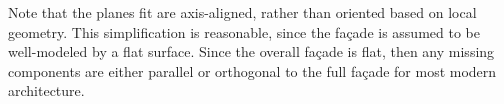 \documentclass{article}
\begin{document}

%
%

Note that the planes fit are axis-aligned, rather than oriented based on local geometry.  This simplification is reasonable, since the fa\c{c}ade is assumed to be well-modeled by a flat surface.  Since the overall fa\c{c}ade is flat, then any missing components are either parallel or orthogonal to the full fa\c{c}ade for most modern architecture.
\end{document}
